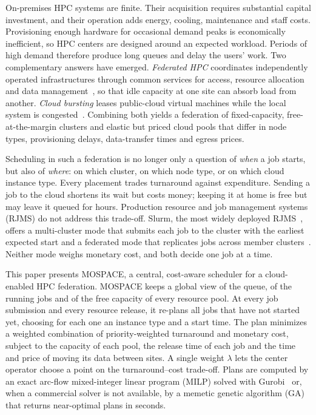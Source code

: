 \documentclass[conference]{IEEEtran}
\begin{document}
On-premises HPC systems are finite. Their acquisition requires substantial capital investment, and their operation adds energy, cooling, maintenance and staff costs. Provisioning enough hardware for occasional demand peaks is economically inefficient, so HPC centers are designed around an expected workload. Periods of high demand therefore produce long queues and delay the users' work. Two complementary answers have emerged. \emph{Federated HPC} coordinates independently operated infrastructures through common services for access, resource allocation and data management~\cite{Foster2001,Gentzsch2011,Alam2022,Magugliani2025}, so that idle capacity at one site can absorb load from another. \emph{Cloud bursting} leases public-cloud virtual machines while the local system is congested~\cite{BUYYA2009599,mell2011nist,deAssuncao2009,Marshall2010}. Combining both yields a federation of fixed-capacity, free-at-the-margin clusters and elastic but priced cloud pools that differ in node types, provisioning delays, data-transfer times and egress prices.

Scheduling in such a federation is no longer only a question of \emph{when} a job starts, but also of \emph{where}: on which cluster, on which node type, or on which cloud instance type. Every placement trades turnaround against expenditure. Sending a job to the cloud shortens its wait but costs money; keeping it at home is free but may leave it queued for hours. Production resource and job management systems (RJMS) do not address this trade-off. Slurm, the most widely deployed RJMS~\cite{Yoo2003}, offers a multi-cluster mode that submits each job to the cluster with the earliest expected start and a federated mode that replicates jobs across member clusters~\cite{Jette2023}. Neither mode weighs monetary cost, and both decide one job at a time.

This paper presents MOSPACE, a central, cost-aware scheduler for a cloud-enabled HPC federation. MOSPACE keeps a global view of the queue, of the running jobs and of the free capacity of every resource pool. At every job submission and every resource release, it re-plans all jobs that have not started yet, choosing for each one an instance type and a start time. The plan minimizes a weighted combination of priority-weighted turnaround and monetary cost, subject to the capacity of each pool, the release time of each job and the time and price of moving its data between sites. A single weight $\lambda$ lets the center operator choose a point on the turnaround--cost trade-off. Plans are computed by an exact arc-flow mixed-integer linear program (MILP) solved with Gurobi~\cite{gurobi} or, when a commercial solver is not available, by a memetic genetic algorithm (GA) that returns near-optimal plans in seconds.
\end{document}
